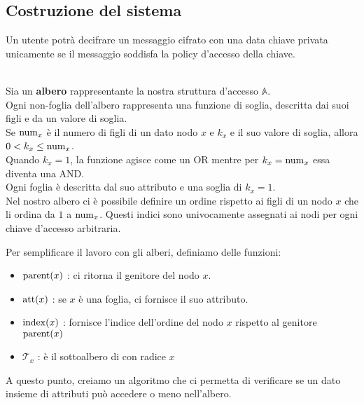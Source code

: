 \subsection{Costruzione del sistema} 

Un utente potrà decifrare un messaggio cifrato con una data chiave privata unicamente se il messaggio soddisfa la policy d'accesso della chiave.\\[0.3cm]

\begin{defi}\-\\
Sia  un \textbf{albero} rappresentante la nostra struttura d'accesso $\mathbb{A}$.\\[0.1cm]
Ogni non-foglia dell'albero rappresenta una funzione di soglia, descritta dai suoi figli e da un valore di soglia.\\
Se $\operatorname{num}_x$ è il numero di figli di un dato nodo $x$ e $k_x$ e il suo valore di soglia, allora $0 < k_x \leq \operatorname{num}_x$.\\
Quando $k_x = 1$, la funzione agisce come un OR mentre per $k_x = \operatorname{num}_x$ essa diventa una AND.\\
Ogni foglia è descritta dal suo attributo e una soglia di $k_x = 1$.\\[0.2cm]
Nel nostro albero ci è possibile definire un ordine rispetto ai figli di un nodo $x$ che li ordina da $1$ a $\operatorname{num}_x$. Questi indici sono univocamente assegnati ai nodi per ogni chiave d'accesso arbitraria.
\end{defi}
\vspace{0.3cm}

Per semplificare il lavoro con gli alberi, definiamo delle funzioni:
\begin{itemize}
\item $\operatorname{parent}(x)$ : ci ritorna il genitore del nodo $x$.
\item $\operatorname{att}(x)$ : se $x$ è una foglia, ci fornisce il suo attributo.
\item $\operatorname{index}(x)$ : fornisce l'indice dell'ordine del nodo $x$ rispetto al genitore $\operatorname{parent}(x)$
\item $\mathcal{T}_x$ : è il sottoalbero di  con radice $x$ 
\end{itemize}

\vspace{0.3cm}
A questo punto, creiamo un algoritmo che ci permetta di verificare se un dato insieme di attributi può accedere o meno nell'albero.
\vspace{0.5cm}

